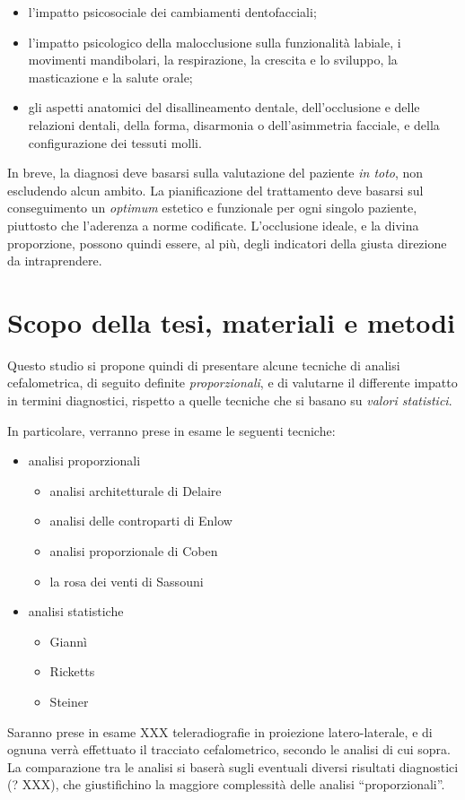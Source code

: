 \begin{itemize}
\item l'impatto psicosociale dei cambiamenti dentofacciali;
\item l'impatto psicologico della malocclusione sulla funzionalità labiale, i movimenti mandibolari, la respirazione, la crescita e lo sviluppo, la masticazione e la salute orale;
\item gli aspetti anatomici del disallineamento dentale, dell'occlusione e delle relazioni dentali, della forma, disarmonia o dell'asimmetria facciale, e della configurazione dei tessuti molli.
\end{itemize}

In breve, la diagnosi deve basarsi sulla valutazione del paziente \textit{in toto}, non escludendo alcun ambito. La pianificazione del trattamento deve basarsi sul conseguimento un \textit{optimum} estetico e funzionale per ogni singolo paziente, piuttosto che l'aderenza a norme codificate. L'occlusione ideale, e la divina proporzione, possono quindi essere, al più, degli indicatori della giusta direzione da intraprendere.

\section{Scopo della tesi, materiali e metodi}
Questo studio si propone quindi di presentare alcune tecniche di analisi cefalometrica, di seguito definite \textit{proporzionali}, e di valutarne il differente impatto in termini diagnostici, rispetto a quelle tecniche che si basano su \textit{valori statistici}.

In particolare, verranno prese in esame le seguenti tecniche:
\begin{itemize}
\item analisi proporzionali
\begin{itemize}
\item analisi architetturale di Delaire
\item analisi delle controparti di Enlow
\item analisi proporzionale di Coben
\item la rosa dei venti di Sassouni
\end{itemize}
\item analisi statistiche
\begin{itemize}
\item Giannì
\item Ricketts
\item Steiner
\end{itemize}
\end{itemize}

Saranno prese in esame XXX teleradiografie in proiezione latero-laterale, e di ognuna verrà effettuato il tracciato cefalometrico, secondo le analisi di cui sopra. La comparazione tra le analisi si baserà sugli eventuali diversi risultati diagnostici (? XXX), che giustifichino la maggiore complessità delle analisi ``proporzionali''.
